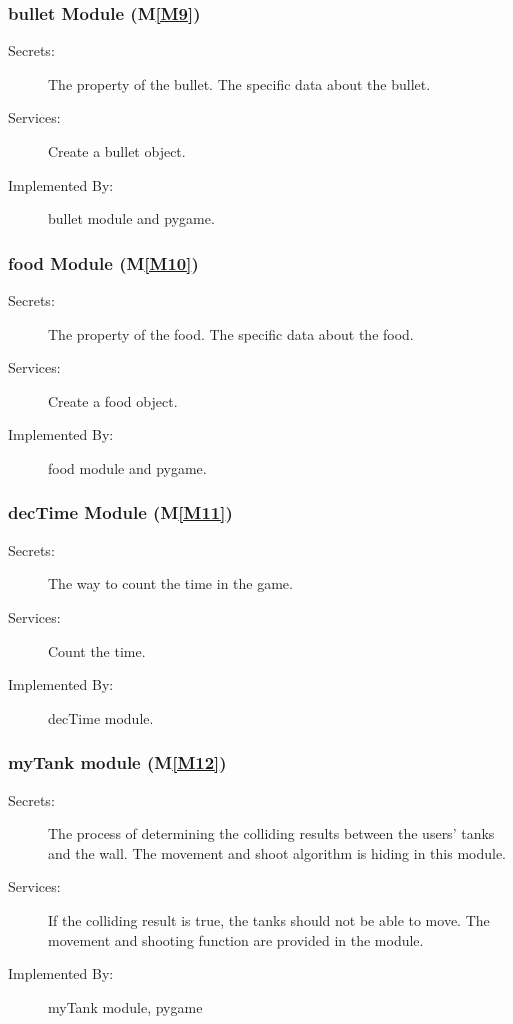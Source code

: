\documentclass[12pt, titlepage]{article}
\newcommand{\mref}[1]{M\ref{#1}}
\begin{document}
\subsubsection{bullet Module (\mref{M9})}
\begin{description}
\item[Secrets:]The property of the bullet. The specific data about the bullet.
\item[Services:] Create a bullet object.
\item[Implemented By:] bullet module and pygame.
\end{description}

\subsubsection{food Module (\mref{M10})}
\begin{description}
\item[Secrets:]The property of the food. The specific data about the food.
\item[Services:] Create a food object.
\item[Implemented By:] food module and pygame.
\end{description}

\subsubsection{decTime Module (\mref{M11})}
\begin{description}
\item[Secrets:]The way to count the time in the game.
\item[Services:] Count the time.
\item[Implemented By:] decTime module.
\end{description}

\subsubsection{myTank module (\mref{M12})}
\begin{description}
\item[Secrets:] The process of determining the colliding results between the users' tanks and the wall. The movement and shoot algorithm is hiding in this module.
\item[Services:] If the colliding result is true, the tanks should not be able to move. The movement and shooting function are provided in the module.
\item[Implemented By:] myTank module, pygame
\end{description}
\end{document}
